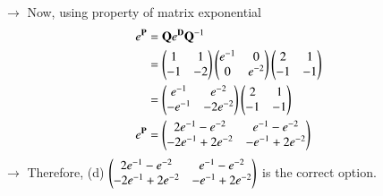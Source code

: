 \documentclass[journal]{IEEEtran}
\begin{document}
$\rightarrow$ Now, using property of matrix exponential
\begin{align}
    e^{\mathbf{P}} &= \mathbf{Q}e^{\mathbf{D}}\mathbf{Q}^{-1} \\
    &= \begin{pmatrix}1&1\\-1&-2\end{pmatrix}\begin{pmatrix}e^{-1}&0\\0&e^{-2}\end{pmatrix}\begin{pmatrix}2&1\\-1&-1\end{pmatrix} \\
    &= \begin{pmatrix}e^{-1}&e^{-2}\\-e^{-1}&-2e^{-2}\end{pmatrix}\begin{pmatrix}2&1\\-1&-1\end{pmatrix} \\
    e^{\mathbf{P}} &= \begin{pmatrix}2e^{-1}-e^{-2}&e^{-1}-e^{-2}\\-2e^{-1}+2e^{-2}&-e^{-1}+2e^{-2}\end{pmatrix}
\end{align}
$\rightarrow$ Therefore, (d) $\begin{pmatrix}2e^{-1}-e^{-2}&e^{-1}-e^{-2}\\-2e^{-1}+2e^{-2}&-e^{-1}+2e^{-2}\end{pmatrix}$ is the correct option.
\end{document}
